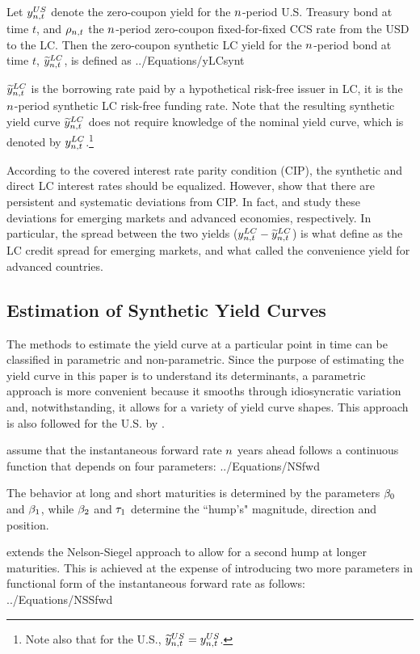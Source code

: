 Let $y_{n,t} ^{US}$ denote the zero-coupon yield for the $n$-period U.S. Treasury bond at time $t$, and $\rho_{n,t}$ the $n$-period zero-coupon fixed-for-fixed CCS rate from the USD to the LC. Then the zero-coupon synthetic LC yield for the $n$-period bond at time $t$, $\widetilde{y}_{n,t} ^{LC}$, is defined as
	 {../Equations/yLCsynt}

$\widetilde{y}_{n,t} ^{LC}$ is the borrowing rate paid by a hypothetical risk-free issuer in LC, it is the $n$-period synthetic LC risk-free funding rate. Note that the resulting synthetic yield curve $\widetilde{y}_{n,t} ^{LC}$ does not require knowledge of the nominal yield curve, which is denoted by $y_{n,t} ^{LC}$.\footnote{Note also that for the U.S., $\widetilde{y}_{n,t} ^{US} = y_{n,t} ^{US}$.}

According to the covered interest rate parity condition (CIP), the synthetic and direct LC interest rates should be equalized. However, \cite*{DuTepperVerdelhan:2018} show that there are persistent and systematic deviations from CIP. In fact, \cite{DuSchreger:2016a} and \cite*{DuImSchreger:2018} study these deviations for emerging markets and advanced economies, respectively. In particular, the spread between the two yields ($y_{n,t} ^{LC} - \widetilde{y}_{n,t} ^{LC}$) is what \cite{DuSchreger:2016a} define as the LC credit spread for emerging markets, and what \cite{DuImSchreger:2018} called the convenience yield for advanced countries.

\subsection{Estimation of Synthetic Yield Curves} \label{sec:synthEstim}
The methods to estimate the yield curve at a particular point in time can be classified in parametric and non-parametric. Since the purpose of estimating the yield curve in this paper is to understand its determinants, a parametric approach is more convenient because it smooths through idiosyncratic variation and, notwithstanding, it allows for a variety of yield curve shapes. This approach is also followed for the U.S. by \citet*{GSW:2007}. 

\cite{NelsonSiegel:1987} assume that the instantaneous forward rate $n$ years ahead follows a continuous function that depends on four parameters:
	 {../Equations/NSfwd}

The behavior at long and short maturities is determined by the parameters $\beta_{0}$ and $\beta_{1}$, while $\beta_{2}$ and $\tau_{1}$ determine the ``hump's" magnitude, direction and position.

\cite{Svensson:1994} extends the Nelson-Siegel approach to allow for a second hump at longer maturities. This is achieved at the expense of introducing two more parameters in functional form of the instantaneous forward rate as follows:
	 {../Equations/NSSfwd}


